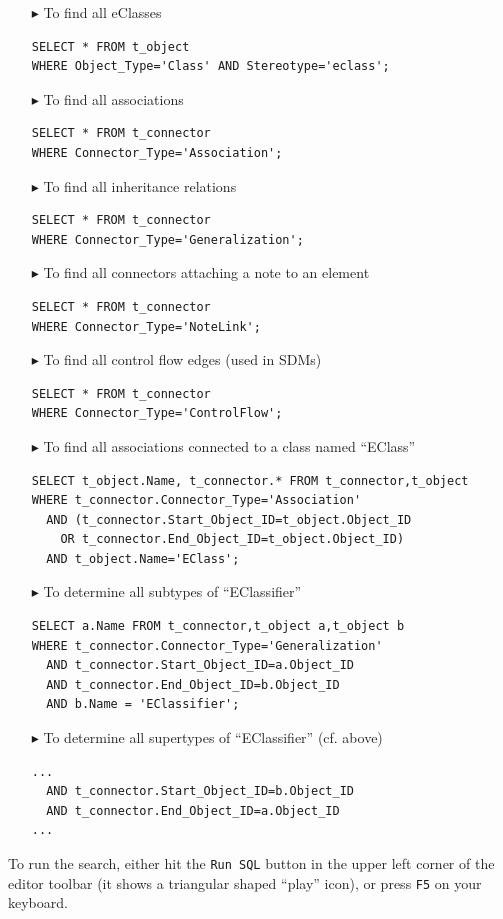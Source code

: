\begin{itemize}

\item[$\blacktriangleright$] To find all eClasses
\begin{lstlisting}[linewidth=11cm]
SELECT * FROM t_object
WHERE Object_Type='Class' AND Stereotype='eclass';
\end{lstlisting}

\item[$\blacktriangleright$] To find all associations
\begin{lstlisting}[linewidth=11cm]
SELECT * FROM t_connector
WHERE Connector_Type='Association';
\end{lstlisting}

\item[$\blacktriangleright$] To find all inheritance relations
\begin{lstlisting}[linewidth=11cm]
SELECT * FROM t_connector
WHERE Connector_Type='Generalization';
\end{lstlisting}

\item[$\blacktriangleright$] To find all connectors attaching a note to an element
\begin{lstlisting}[linewidth=11cm]
SELECT * FROM t_connector
WHERE Connector_Type='NoteLink';
\end{lstlisting}

\item[$\blacktriangleright$] To find all control flow edges (used in SDMs)
\begin{lstlisting}[linewidth=11cm]
SELECT * FROM t_connector
WHERE Connector_Type='ControlFlow';
\end{lstlisting}

\item[$\blacktriangleright$] To find all associations connected to a class named ``EClass''
\begin{lstlisting}[linewidth=11cm]
SELECT t_object.Name, t_connector.* FROM t_connector,t_object
WHERE t_connector.Connector_Type='Association'
  AND (t_connector.Start_Object_ID=t_object.Object_ID
    OR t_connector.End_Object_ID=t_object.Object_ID)
  AND t_object.Name='EClass';
\end{lstlisting}

\item[$\blacktriangleright$] To determine all subtypes of ``EClassifier''
\begin{lstlisting}[linewidth=11cm]
SELECT a.Name FROM t_connector,t_object a,t_object b
WHERE t_connector.Connector_Type='Generalization'
  AND t_connector.Start_Object_ID=a.Object_ID
  AND t_connector.End_Object_ID=b.Object_ID
  AND b.Name = 'EClassifier';
\end{lstlisting}

\item[$\blacktriangleright$] To determine all supertypes of ``EClassifier'' (cf. above)
\begin{lstlisting}[linewidth=11cm]
...
  AND t_connector.Start_Object_ID=b.Object_ID
  AND t_connector.End_Object_ID=a.Object_ID
...
\end{lstlisting}

\end{itemize}

To run the search, either hit the \texttt{Run SQL} button in the upper left corner of the editor toolbar (it shows a triangular shaped ``play'' icon), or
press \texttt{F5} on your keyboard.

\clearpage

